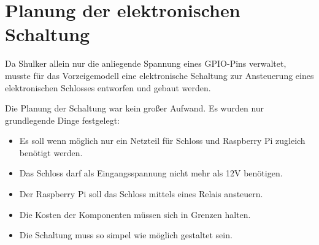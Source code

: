 \section{Planung der elektronischen Schaltung}
Da Shulker allein nur die anliegende Spannung eines GPIO-Pins verwaltet, musste für das Vorzeigemodell eine
elektronische Schaltung zur Ansteuerung eines elektronischen Schlosses entworfen und gebaut werden.

Die Planung der Schaltung war kein großer Aufwand. Es wurden nur grundlegende Dinge festgelegt:
\begin{itemize}
    \item Es soll wenn möglich nur ein Netzteil für Schloss und Raspberry Pi zugleich benötigt werden.
    \item Das Schloss darf als Eingangsspannung nicht mehr als 12V benötigen.
    \item Der Raspberry Pi soll das Schloss mittels eines Relais ansteuern.
    \item Die Kosten der Komponenten müssen sich in Grenzen halten.
    \item Die Schaltung muss so simpel wie möglich gestaltet sein.
\end{itemize}